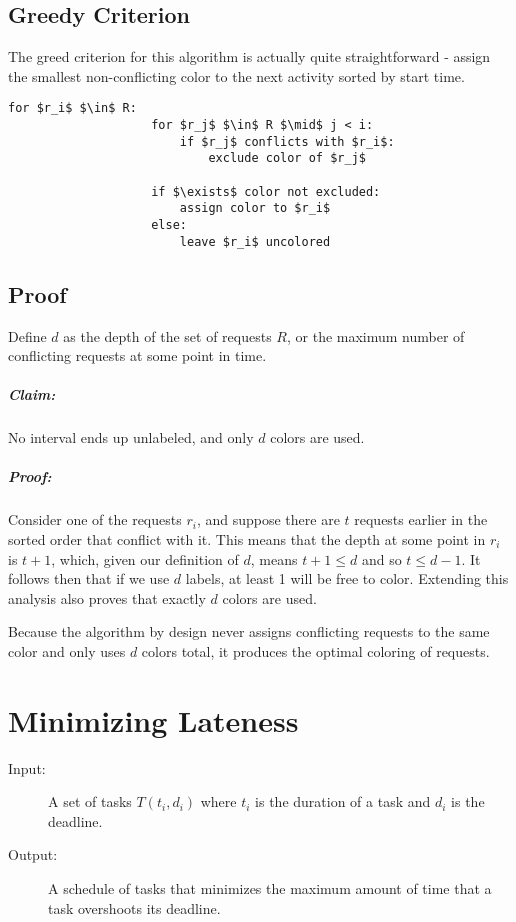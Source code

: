 \documentclass[11pt]{article}
\begin{document}
		\subsection{Greedy Criterion}
			The greed criterion for this algorithm is actually quite straightforward - assign the smallest non-conflicting color to the next activity sorted by start time.
			
			\begin{lstlisting}[autogobble=true,mathescape]
				for $r_i$ $\in$ R:
					for $r_j$ $\in$ R $\mid$ j < i:
						if $r_j$ conflicts with $r_i$:
							exclude color of $r_j$
							
					if $\exists$ color not excluded:
						assign color to $r_i$
					else:
						leave $r_i$ uncolored
			\end{lstlisting}
		
		\subsection{Proof}
			Define $d$ as the depth of the set of requests $R$, or the maximum number of conflicting requests at some point in time.
			
			\subparagraph{Claim:} No interval ends up unlabeled, and only $d$ colors are used.
			
			\subparagraph{Proof:} Consider one of the requests $r_i$, and suppose there are $t$ requests earlier in the sorted order that conflict with it. This means that the depth at some point in $r_i$ is $t + 1$, which, given our definition of $d$, means $t + 1\leq d$ and so $t \leq d - 1$. It follows then that if we use $d$ labels, at least 1 will be free to color. Extending this analysis also proves that exactly $d$ colors are used.
			
			Because the algorithm by design never assigns conflicting requests to the same color and only uses $d$ colors total, it produces the optimal coloring of requests.
		
\section{Minimizing Lateness}
	\begin{description}
		\item[Input:] A set of tasks $T(t_i, d_i)$ where $t_i$ is the duration of a task and $d_i$ is the deadline.
		\item[Output:] A schedule of tasks that minimizes the maximum amount of time that a task overshoots its deadline.
	\end{description}	
	
\end{document}
